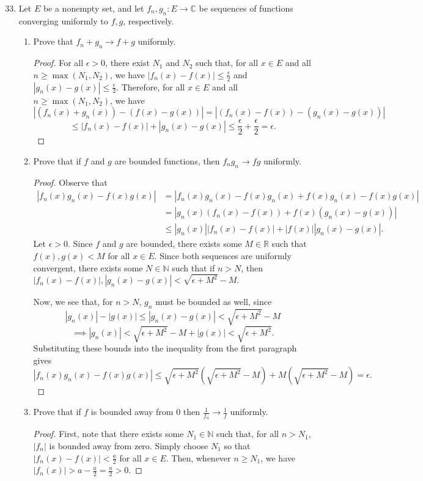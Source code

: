 \documentclass[10pt]{article}
\newcommand{\N}{\mathbb{N}}
\newcommand{\R}{\mathbb{R}}
\newcommand{\C}{\mathbb{C}}
\begin{document}
\begin{enumerate}
\setcounter{enumi}{32}
\item Let $E$ be a nonempty set, and let $f_n, g_n : E \rightarrow \C$ be sequences of functions converging uniformly to $f,g$, respectively.
\begin{enumerate}
\item Prove that $f_n + g_n \rightarrow f + g$ uniformly.
\begin{proof}
For all $\epsilon > 0$, there exist $N_1$ and $N_2$ such that, for all $x \in E$ and all $n \geq \max(N_1, N_2)$, we have $|f_n(x) - f(x)| \leq \frac{\epsilon}{2}$ and $|g_n(x) - g(x)| \leq \frac{\epsilon}{2}$.  Therefore, for all $x \in E$ and all $n \geq \max(N_1, N_2)$, we have
$$
|(f_n(x) + g_n(x)) - (f(x) - g(x))| = |(f_n(x) - f(x)) - (g_n(x) - g(x))|
$$
$$
\leq |f_n(x) - f(x)| + |g_n(x) - g(x)| \leq \frac{\epsilon}{2} + \frac{\epsilon}{2} = \epsilon.
$$
\end{proof}
\item Prove that if $f$ and $g$ are bounded functions, then $f_n g_n \rightarrow fg$ uniformly.
\begin{proof}
Observe that
\begin{align*}
|f_n(x)g_n(x) - f(x)g(x)| &=
|f_n(x)g_n(x) - f(x)g_n(x) + f(x)g_n(x) - f(x)g(x)|
\\
&= |g_n(x)(f_n(x) - f(x)) + f(x)(g_n(x)-g(x))|
\\
&\leq |g_n(x)||f_n(x) - f(x)| + |f(x)||g_n(x)-g(x)|.
\end{align*}
Let $\epsilon > 0.$  Since $f$ and $g$ are bounded, there exists some $M \in \R$ such that $f(x), g(x) < M$ for all $x \in E$.  Since both sequences are uniformly convergent, there exists some $N \in \N$ such that if $n > N$, then $|f_n(x) - f(x)|, |g_n(x) - g(x)| < \sqrt{\epsilon + M^2} - M$.

Now, we see that, for $n > N$, $g_n$ must be bounded as well, since
$$
|g_n(x)| - |g(x)| \leq |g_n(x) - g(x)| < \sqrt{\epsilon + M^2} - M
$$
$$
\implies
|g_n(x)| < \sqrt{\epsilon + M^2} - M + |g(x)| < \sqrt{\epsilon + M^2}.
$$
Substituting these bounds into the inequality from the first paragraph gives
$$
|f_n(x)g_n(x) - f(x)g(x)| \leq\sqrt{\epsilon + M^2}(\sqrt{\epsilon + M^2} - M) + M (\sqrt{\epsilon + M^2} - M) = \epsilon.
$$
\end{proof}
\item Prove that if $f$ is bounded away from $0$ then $\frac{1}{f_n} \rightarrow \frac{1}{f}$ uniformly.
\begin{proof}
First, note that there exists some $N_1 \in \N$ such that, for all $n > N_1$, $|f_n|$ is bounded away from zero.  Simply choose $N_1$ so that $|f_n(x) - f(x)| < \frac{a}{2}$ for all $x \in E$.  Then, whenever $n \geq N_1$, we have $|f_n(x)| > a - \frac{a}{2} = \frac{a}{2} > 0$.


\end{proof}
\end{enumerate}
\end{enumerate}
\end{document}
